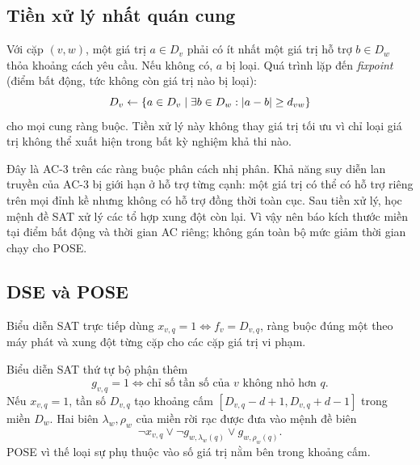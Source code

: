 \subsection{Tiền xử lý nhất quán cung}

Với cặp \((v,w)\), một giá trị \(a\in D_v\) phải có ít nhất một giá trị hỗ trợ
\(b\in D_w\) thỏa khoảng cách yêu cầu. Nếu không có, \(a\) bị loại. Quá trình
lặp đến \emph{fixpoint} (điểm bất động, tức không còn giá trị nào bị loại):
\[
  D_v\leftarrow
  \left\{a\in D_v\mid
    \exists b\in D_w:\lvert a-b\rvert\ge d_{vw}\right\}
\]
cho mọi cung ràng buộc. Tiền xử lý này không thay giá trị tối ưu vì chỉ loại giá
trị không thể xuất hiện trong bất kỳ nghiệm khả thi nào.

Đây là AC-3 trên các ràng buộc phân cách nhị phân. Khả năng suy diễn lan truyền của AC-3 bị giới hạn ở
hỗ trợ từng cạnh: một giá trị có thể có hỗ trợ riêng trên mọi đỉnh kề nhưng
không có hỗ trợ đồng thời toàn cục. Sau tiền xử lý, học mệnh đề SAT xử lý các
tổ hợp xung đột còn lại. Vì vậy nên báo kích thước miền tại điểm bất động và
thời gian AC riêng; không gán toàn bộ mức giảm thời gian chạy cho POSE.

\subsection{DSE và POSE}

Biểu diễn SAT trực tiếp dùng \(x_{v,q}=1\iff f_v=D_{v,q}\), ràng buộc đúng một
theo máy phát và xung đột từng cặp cho các cặp giá trị vi phạm.

Biểu diễn SAT thứ tự bộ phận thêm
\[
  g_{v,q}=1\iff
  \text{chỉ số tần số của }v\text{ không nhỏ hơn }q.
\]
Nếu \(x_{v,q}=1\), tần số \(D_{v,q}\) tạo khoảng cấm
\([D_{v,q}-d+1,D_{v,q}+d-1]\) trong miền \(D_w\). Hai biên
\(\lambda_w,\rho_w\) của miền rời rạc được đưa vào mệnh đề biên
\[
  \neg x_{v,q}
  \lor
  \neg g_{w,\lambda_w(q)}
  \lor
  g_{w,\rho_w(q)}.
\]
POSE vì thế loại sự phụ thuộc vào số giá trị nằm bên trong khoảng cấm.

